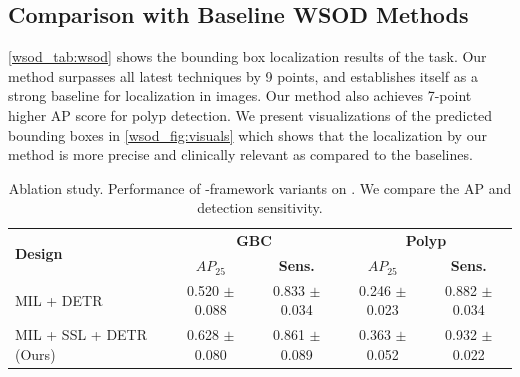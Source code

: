 \subsection{Comparison with Baseline WSOD Methods}
%
\cref{wsod_tab:wsod} shows the bounding box localization results of the \wsod task. Our method surpasses all latest \sota \wsod techniques by 9 points, and establishes itself as a strong \wsod baseline for \gbc localization in \usg images. Our method also achieves 7-point higher AP score for polyp detection. We present visualizations of the predicted bounding boxes in \cref{wsod_fig:visuals} which shows that the localization by our method is more precise and clinically relevant as compared to the baselines. 
%
\begin{table}[t]
	\centering
    \footnotesize
	\setlength{\tabcolsep}{6pt}
	\begin{tabular}{lcccc}
		\toprule
        \multirow{2}{*}{\textbf{Design}} & \multicolumn{2}{c}{\textbf{GBC}} & \multicolumn{2}{c}{\textbf{Polyp}} \\
		 & \textbf{$AP_{25}$} & \textbf{Sens.} & \textbf{$AP_{25}$} & \textbf{Sens.} \\
		\midrule
            MIL + DETR & 0.520 $\pm$ 0.088 & 0.833 $\pm$ 0.034 & 0.246 $\pm$ 0.023 & 0.882 $\pm$ 0.034\\	        
            MIL + SSL + DETR (Ours) & 0.628 $\pm$ 0.080 & 0.861 $\pm$ 0.089 & 0.363 $\pm$ 0.052 & 0.932 $\pm$ 0.022\\
		\bottomrule
	\end{tabular}
    \caption[Ablation study on the proposed weakly supervised DETR]{Ablation study. Performance of \mil-framework variants on \detr. We compare the AP and detection sensitivity.} 
	\label{wsod_tab:ablation}
\end{table}

